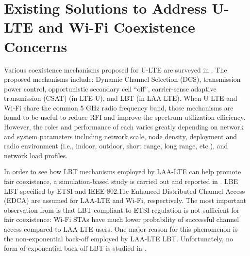 \section{Existing Solutions to Address U-LTE and Wi-Fi Coexistence Concerns}

Various coexistence mechanisms proposed for \mbox{U-LTE} are surveyed in \cite{U-LTE-survey-2014, U-LTE-survey-2015, U-LTE-5G-2015}. The proposed mechanisms include: Dynamic Channel Selection (DCS), transmission power control, opportunistic secondary cell ``off'', carrier-sense adaptive transmission (CSAT) (in \mbox{LTE-U}), and LBT (in \mbox{LAA-LTE}). When \mbox{U-LTE} and \mbox{Wi-Fi} share the common $5$ GHz radio frequency band, those mechanisms are found to be useful to reduce RFI and improve the spectrum utilization efficiency. However, the roles and performance of each varies greatly depending on network and system parameters including network scale, node density, deployment and radio environment (i.e., indoor, outdoor, short range, long range, etc.), and network load profiles. 

In order to see how LBT mechanisms employed by \mbox{LAA-LTE} can help promote fair coexistence, a simulation-based study is carried out and reported in \cite{LBT-CableLabs-2014}. LBE LBT specified by ETSI \cite{LBT-ETSI-2014} and IEEE 802.11e Enhanced Distributed Channel Access (EDCA) are assumed for \mbox{LAA-LTE} and \mbox{Wi-Fi}, respectively. The most important observation from \cite{LBT-CableLabs-2014} is that LBT compliant to ETSI regulation is not sufficient for fair coexistence: \mbox{Wi-Fi} STAs have much lower probability of successful channel access compared to \mbox{LAA-LTE} users. One major reason for this phenomenon is the non-exponential back-off employed by \mbox{LAA-LTE} LBT. Unfortunately, no form of exponential back-off LBT is studied in \cite{LBT-CableLabs-2014}.

